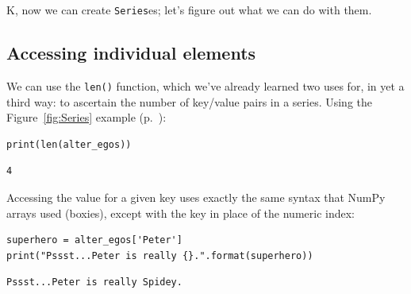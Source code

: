 
\chapter[Assoc.~arrays in Python (2 of 3)]{\LARGE\selectfont{Associative
arrays in Python (2 of 3)}}
\label{ch:assocArraysInPython2}

K, now we can create \texttt{Series}es; let's figure out what we can do with
them.

\section{Accessing individual elements}


We can use the \texttt{len()} function, which we've already learned two uses
for, in yet a third way: to ascertain the number of key/value pairs in a
series. Using the Figure~\ref{fig:Series} example (p.~\pageref{fig:Series}):

\begin{Verbatim}[fontsize=\small,samepage=true,frame=single,framesep=3mm]
print(len(alter_egos))
\end{Verbatim}

\begin{Verbatim}[fontsize=\small,samepage=true,frame=leftline,framesep=5mm,framerule=1mm]
4
\end{Verbatim}


Accessing the value for a given key uses exactly the same syntax that NumPy
arrays used (boxies), except with the key in place of the numeric index:

\begin{Verbatim}[fontsize=\small,samepage=true,frame=single,framesep=3mm]
superhero = alter_egos['Peter']
print("Pssst...Peter is really {}.".format(superhero))
\end{Verbatim}

\begin{Verbatim}[fontsize=\small,samepage=true,frame=leftline,framesep=5mm,framerule=1mm]
Pssst...Peter is really Spidey.
\end{Verbatim}


